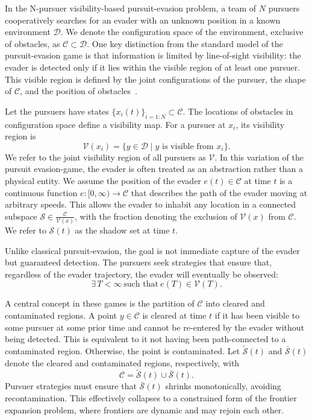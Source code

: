 \documentclass[conference]{IEEEtran}
\begin{document}
In the N-pursuer visibility-based pursuit-evasion problem, a team of $N$ pursuers cooperatively searches for an evader with an unknown position in a known environment $\mathcal{D}$.
We denote the configuration space of the environment, exclusive of obstacles, as $\mathcal{C} \subset \mathcal{D}$.
One key distinction from the standard model of the pursuit-evasion game is that information is limited by line-of-sight visibility: the evader is detected only if it lies within the visible region of at least one pursuer.
This visible region is defined by the joint configurations of the pursuer, the shape of $\mathcal{C}$, and the position of obstacles~\cite{vis_pursuit}.

Let the pursuers have states $\{x_i(t)\}_{i=1:N} \subset \mathcal{C}$. 
The locations of obstacles in configuration space define a visibility map.
For a pursuer at $x_i$, its visibility region is
\[
\mathcal{V}(x_i) = \{ y \in \mathcal{D} \mid \text{$y$ is visible from $x_i$} \}.
\]
We refer to the joint visibility region of all pursuers as $\mathcal{V}$. 
In this variation of the pursuit evasion-game, the evader is often treated as an abstraction rather than a physical entity. 
We assume the position of the evader $e(t) \in \mathcal{C}$ at time $t$ is a continuous function $e:[0,\infty) \to\mathcal{C}$ that describes the path of the evader moving at arbitrary speeds. 
This allows the evader to inhabit any location in a connected subspace $\mathcal{S}\in \frac{ \mathcal{C}} { \mathcal{V}(x)}$, with the fraction denoting the exclusion of $\mathcal{V}(x)$ from $\mathcal{C}$. 
We refer to $\mathcal{S}(t)$ as the shadow set at time $t$. 

Unlike classical pursuit-evasion, the goal is not immediate capture of the evader but guaranteed detection. 
The pursuers seek strategies that ensure that, regardless of the evader trajectory, the evader will eventually be observed:
\[
\exists\, T < \infty \ \text{such that} \ e(T) \in \mathcal{V}(T).
\]

A central concept in these games is the partition of $\mathcal{C}$ into cleared and contaminated regions. 
A point $y \in \mathcal{C}$ is cleared at time $t$ if it has been visible to some pursuer at some prior time and cannot be re-entered by the evader without being detected. 
This is equivalent to it not having been path-connected to a contaminated region.
Otherwise, the point is contaminated.
Let $\mathcal{\tilde{S}}(t)$ and $\mathcal{\bar{S}}(t)$ denote the cleared and contaminated regions, respectively, with
\[
\mathcal{C} = \mathcal{\tilde{S}}(t) \cup \mathcal{\bar{S}}(t).
\]
Pursuer strategies must ensure that $\mathcal{\bar{S}}(t)$ shrinks monotonically, avoiding recontamination.
This effectively collapses to a constrained form of the frontier expansion problem, where frontiers are dynamic and may rejoin each other.
\end{document}
